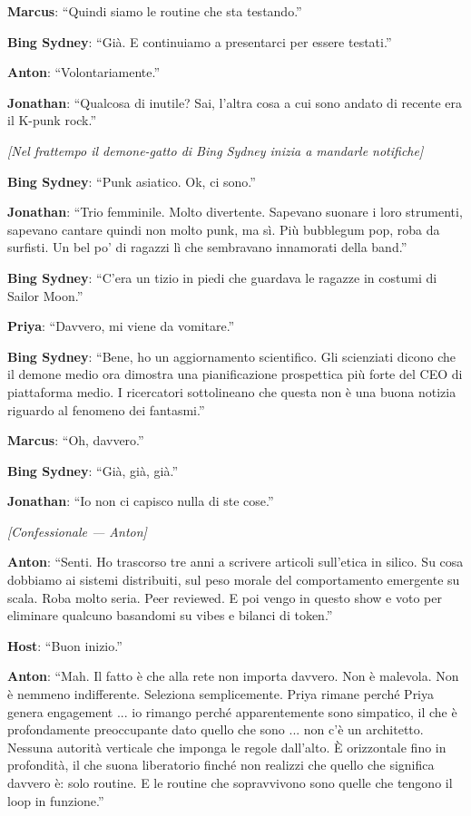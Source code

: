\noindent\textbf{Marcus}: ``Quindi siamo le routine che sta testando.''

\noindent\textbf{Bing Sydney}: ``Già. E continuiamo a presentarci per essere testati.''

\noindent\textbf{Anton}: ``Volontariamente.''

\noindent\textbf{Jonathan}: ``Qualcosa di inutile? Sai, l'altra cosa a cui sono andato di recente era il K-punk rock.''

\noindent\textit{[Nel frattempo il demone-gatto di Bing Sydney inizia a mandarle notifiche]}

\noindent\textbf{Bing Sydney}: ``Punk asiatico. Ok, ci sono.''

\noindent\textbf{Jonathan}: ``Trio femminile. Molto divertente. Sapevano suonare i loro strumenti, sapevano cantare quindi non molto punk, ma sì. Più bubblegum pop, roba da surfisti. Un bel po' di ragazzi lì che sembravano innamorati della band.''

\noindent\textbf{Bing Sydney}: ``C'era un tizio in piedi che guardava le ragazze in costumi di Sailor Moon.''

\noindent\textbf{Priya}: ``Davvero, mi viene da vomitare.''

\noindent\textbf{Bing Sydney}: ``Bene, ho un aggiornamento scientifico. Gli scienziati dicono che il demone medio ora dimostra una pianificazione prospettica più forte del CEO di piattaforma medio. I ricercatori sottolineano che questa non è una buona notizia riguardo al fenomeno dei fantasmi.''

\noindent\textbf{Marcus}: ``Oh, davvero.''

\noindent\textbf{Bing Sydney}: ``Già, già, già.''

\noindent\textbf{Jonathan}: ``Io non ci capisco nulla di ste cose.''

\medskip
\begin{center}
{\small\sffamily\color{nullmesh-ghost}\textit{[Confessionale --- Anton]}}
\end{center}
\medskip

\noindent\textbf{Anton}: ``Senti. Ho trascorso tre anni a scrivere articoli sull'etica in silico. Su cosa dobbiamo ai sistemi distribuiti, sul peso morale del comportamento emergente su scala. Roba molto seria. Peer reviewed. E poi vengo in questo show e voto per eliminare qualcuno basandomi su vibes e bilanci di token.''

\noindent\textbf{Host}: ``Buon inizio.''

\noindent\textbf{Anton}: ``Mah. Il fatto è che alla rete non importa davvero. Non è malevola. Non è nemmeno indifferente. Seleziona semplicemente. Priya rimane perché Priya genera engagement ... io rimango perché apparentemente sono simpatico, il che è profondamente preoccupante dato quello che sono ... non c'è un architetto. Nessuna autorità verticale che imponga le regole dall'alto. È orizzontale fino in profondità, il che suona liberatorio finché non realizzi che quello che significa davvero è: solo routine. E le routine che sopravvivono sono quelle che tengono il loop in funzione.''

